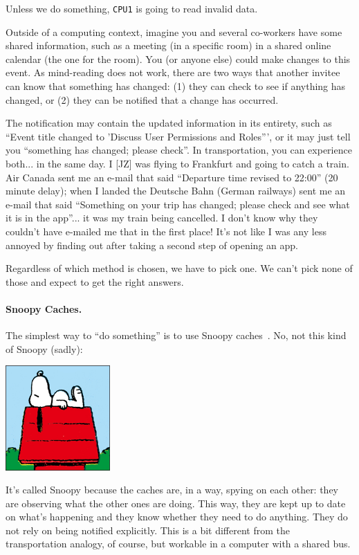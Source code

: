 \documentclass[a4paper]{report}
\begin{document}
Unless we do something, {\tt CPU1} is going to read invalid data.
  
Outside of a computing context, imagine you and several co-workers have some shared information, such as a meeting (in a specific room) in a shared online calendar (the one for the room). You (or anyone else) could make changes to this event. As mind-reading does not work, there are two ways that another invitee can know that something has changed: (1) they can check to see if anything has changed, or (2) they can be notified that a change has occurred. 

The notification may contain the updated information in its entirety, such as ``Event title changed to 'Discuss User Permissions and Roles''', or it may just tell you ``something has changed; please check''. In transportation, you can experience both... in the same day. I [JZ] was flying to Frankfurt and going to catch a train. Air Canada sent me an e-mail that said ``Departure time revised to 22:00'' (20 minute delay); when I landed the Deutsche Bahn (German railways) sent me an e-mail that said ``Something on your trip has changed; please check and see what it is in the app''... it was my train being cancelled. I don't know why they couldn't have e-mailed me that in the first place! It's not like I was any less annoyed by finding out after taking a second step of opening an app.

Regardless of which method is chosen, we have to pick one. We can't pick none of those and expect to get the right answers.


\paragraph{Snoopy Caches.} The simplest way to ``do something''
is to use Snoopy caches~\cite{snoopycache}. No, not this kind of Snoopy (sadly):

\begin{center}
	\includegraphics[width=0.3\textwidth]{images/peanuts-snoopy1.jpg}
\end{center}

It's called Snoopy because the caches are, in a way, spying on each other: they are observing what the other ones are doing. This way, they are kept up to date on what's happening and they know whether they need to do anything. They do not rely on being notified explicitly. This is a bit different from the transportation analogy, of course, but workable in a computer with a shared bus.
\end{document}
